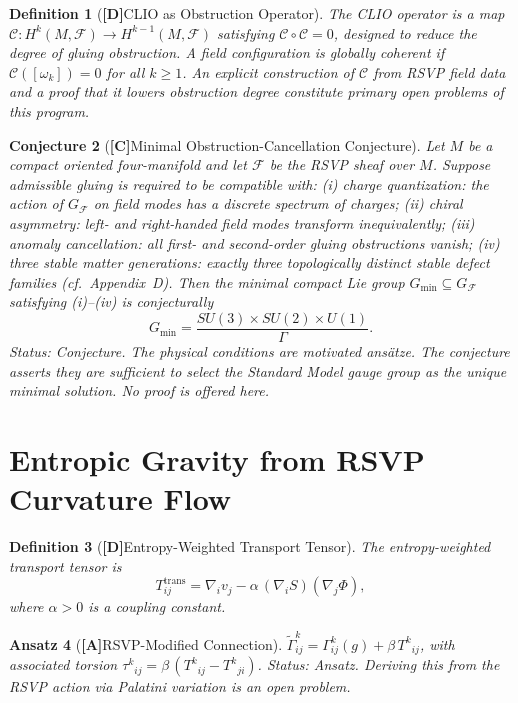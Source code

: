 \documentclass[12pt,a4paper]{article}
\newcommand{\claimD}{\textbf{[D]}\;}
\newcommand{\claimA}{\textbf{[A]}\;}
\newcommand{\claimC}{\textbf{[C]}\;}
\newtheorem{defn}{Definition}[section]
\newtheorem{appansatz}[defn]{Ansatz}
\newtheorem{appconj}[defn]{Conjecture}
\begin{document}
\begin{defn}[\claimD CLIO as Obstruction Operator]
The CLIO operator is a map
$\mathcal{C}: H^k(M,\mathcal{F})\to H^{k-1}(M,\mathcal{F})$
satisfying $\mathcal{C}\circ\mathcal{C} = 0$, designed to reduce the degree of
gluing obstruction. A field configuration is globally coherent if
$\mathcal{C}([\omega_k]) = 0$ for all $k\geq 1$. An explicit construction of
$\mathcal{C}$ from RSVP field data and a proof that it lowers obstruction degree
constitute primary open problems of this program.
\end{defn}

\begin{appconj}[\claimC Minimal Obstruction-Cancellation Conjecture]
Let $M$ be a compact oriented four-manifold and let $\mathcal{F}$ be the RSVP
sheaf over $M$. Suppose admissible gluing is required to be compatible with:
(i) \emph{charge quantization}: the action of $G_{\mathcal{F}}$ on field modes
has a discrete spectrum of charges; (ii) \emph{chiral asymmetry}: left- and
right-handed field modes transform inequivalently; (iii) \emph{anomaly
cancellation}: all first- and second-order gluing obstructions vanish; (iv)
\emph{three stable matter generations}: exactly three topologically distinct
stable defect families (cf.\ Appendix~D). Then the minimal compact Lie group
$G_{\min}\subseteq G_{\mathcal{F}}$ satisfying (i)--(iv) is conjecturally
\[
  G_{\min} = \frac{SU(3)\times SU(2)\times U(1)}{\Gamma}.
\]
\emph{Status: Conjecture.} The physical conditions are motivated ans\"{a}tze.
The conjecture asserts they are sufficient to select the Standard Model gauge
group as the unique minimal solution. No proof is offered here.
\end{appconj}

\section{Entropic Gravity from RSVP Curvature Flow}

\begin{defn}[\claimD Entropy-Weighted Transport Tensor]
The entropy-weighted transport tensor is
\[
T_{ij}^{\mathrm{trans}} = \nabla_i v_j - \alpha\,(\nabla_i S)(\nabla_j\Phi),
\]
where $\alpha > 0$ is a coupling constant.
\end{defn}

\begin{appansatz}[\claimA RSVP-Modified Connection]
$\widetilde{\Gamma}^k_{ij} = \Gamma^k_{ij}(g) + \beta\,T^k{}_{ij}$,
with associated torsion
$\tau^k{}_{ij} = \beta\,(T^k{}_{ij} - T^k{}_{ji})$.
\emph{Status: Ansatz.} Deriving this from the RSVP action via Palatini variation
is an open problem.
\end{appansatz}
\end{document}
